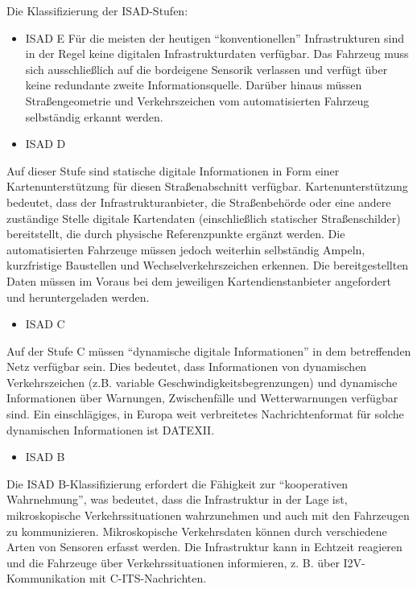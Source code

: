 \documentclass[
]{book}
\providecommand{\tightlist}{%
  \setlength{\itemsep}{0pt}\setlength{\parskip}{0pt}}
\begin{document}
Die Klassifizierung der ISAD-Stufen:

\begin{itemize}
\item
  ISAD E
  Für die meisten der heutigen ``konventionellen'' Infrastrukturen sind in der Regel keine digitalen Infrastrukturdaten verfügbar. Das Fahrzeug muss sich ausschließlich auf die bordeigene Sensorik verlassen und verfügt über keine redundante zweite Informationsquelle. Darüber hinaus müssen Straßengeometrie und Verkehrszeichen vom automatisierten Fahrzeug selbständig erkannt werden.
\item
  ISAD D
\end{itemize}

Auf dieser Stufe sind statische digitale Informationen in Form einer Kartenunterstützung für diesen Straßenabschnitt verfügbar. Kartenunterstützung bedeutet, dass der Infrastrukturanbieter, die Straßenbehörde oder eine andere zuständige Stelle digitale Kartendaten (einschließlich statischer Straßenschilder) bereitstellt, die durch physische Referenzpunkte ergänzt werden. Die automatisierten Fahrzeuge müssen jedoch weiterhin selbständig Ampeln, kurzfristige Baustellen und Wechselverkehrszeichen erkennen. Die bereitgestellten Daten müssen im Voraus bei dem jeweiligen Kartendienstanbieter angefordert und heruntergeladen werden.

\begin{itemize}
\tightlist
\item
  ISAD C
\end{itemize}

Auf der Stufe C müssen ``dynamische digitale Informationen'' in dem betreffenden Netz verfügbar sein. Dies bedeutet, dass Informationen von dynamischen Verkehrszeichen (z.B. variable Geschwindigkeitsbegrenzungen) und dynamische Informationen über Warnungen, Zwischenfälle und Wetterwarnungen verfügbar sind. Ein einschlägiges, in Europa weit verbreitetes Nachrichtenformat für solche dynamischen Informationen ist DATEXII.

\begin{itemize}
\tightlist
\item
  ISAD B
\end{itemize}

Die ISAD B-Klassifizierung erfordert die Fähigkeit zur ``kooperativen Wahrnehmung'', was bedeutet, dass die Infrastruktur in der Lage ist, mikroskopische Verkehrssituationen wahrzunehmen und auch mit den Fahrzeugen zu kommunizieren. Mikroskopische Verkehrsdaten können durch verschiedene Arten von Sensoren erfasst werden. Die Infrastruktur kann in Echtzeit reagieren und die Fahrzeuge über Verkehrssituationen informieren, z. B. über I2V-Kommunikation mit C-ITS-Nachrichten.
\end{document}
